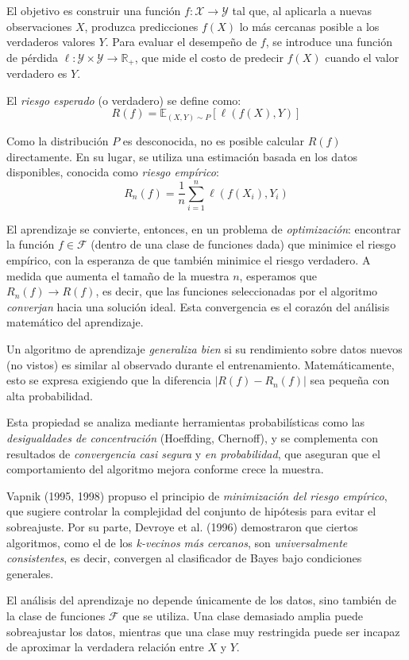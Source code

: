 \documentclass[12pt]{article}
\begin{document}
El objetivo es construir una función $f: \mathcal{X} \to \mathcal{Y}$ tal que, al aplicarla a nuevas observaciones $X$, produzca predicciones $f(X)$ lo más cercanas posible a los verdaderos valores $Y$. Para evaluar el desempeño de $f$, se introduce una función de pérdida $\ell: \mathcal{Y} \times \mathcal{Y} \to \mathbb{R}_+$, que mide el costo de predecir $f(X)$ cuando el valor verdadero es $Y$.

El \textit{riesgo esperado} (o verdadero) se define como:
\[
R(f) = \mathbb{E}_{(X, Y) \sim P}[\ell(f(X), Y)]
\]

Como la distribución $P$ es desconocida, no es posible calcular $R(f)$ directamente. En su lugar, se utiliza una estimación basada en los datos disponibles, conocida como \textit{riesgo empírico}:
\[
R_n(f) = \frac{1}{n} \sum_{i=1}^n \ell(f(X_i), Y_i)
\]

El aprendizaje se convierte, entonces, en un problema de \textit{optimización}: encontrar la función $f \in \mathcal{F}$ (dentro de una clase de funciones dada) que minimice el riesgo empírico, con la esperanza de que también minimice el riesgo verdadero. A medida que aumenta el tamaño de la muestra $n$, esperamos que $R_n(f) \to R(f)$, es decir, que las funciones seleccionadas por el algoritmo \textit{converjan} hacia una solución ideal. Esta convergencia es el corazón del análisis matemático del aprendizaje.

Un algoritmo de aprendizaje \textit{generaliza bien} si su rendimiento sobre datos nuevos (no vistos) es similar al observado durante el entrenamiento. Matemáticamente, esto se expresa exigiendo que la diferencia $|R(f) - R_n(f)|$ sea pequeña con alta probabilidad.

Esta propiedad se analiza mediante herramientas probabilísticas como las \textit{desigualdades de concentración} (Hoeffding, Chernoff), y se complementa con resultados de \textit{convergencia casi segura} y \textit{en probabilidad}, que aseguran que el comportamiento del algoritmo mejora conforme crece la muestra.

Vapnik (1995, 1998) propuso el principio de \textit{minimización del riesgo empírico}, que sugiere controlar la complejidad del conjunto de hipótesis para evitar el sobreajuste. Por su parte, Devroye et al. (1996) demostraron que ciertos algoritmos, como el de los \textit{k-vecinos más cercanos}, son \textit{universalmente consistentes}, es decir, convergen al clasificador de Bayes bajo condiciones generales.

El análisis del aprendizaje no depende únicamente de los datos, sino también de la clase de funciones $\mathcal{F}$ que se utiliza. Una clase demasiado amplia puede sobreajustar los datos, mientras que una clase muy restringida puede ser incapaz de aproximar la verdadera relación entre $X$ y $Y$.
\end{document}
